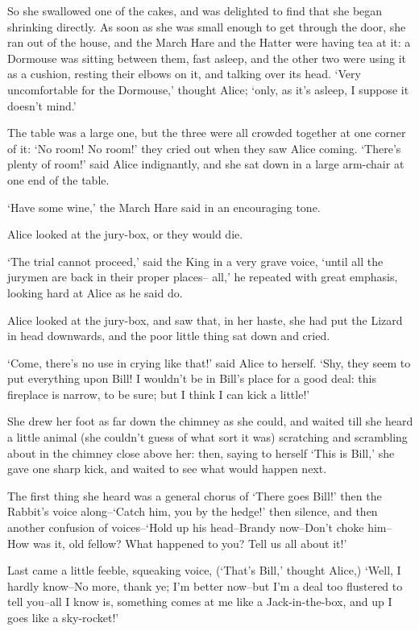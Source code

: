 \documentclass[statementpaper,twoside,openany]{memoir}
\begin{document}
So she swallowed one of the cakes, and was delighted to find that she began shrinking directly. As soon as she was small enough to get through the door, she ran out of the house, and the March Hare and the Hatter were having tea at it: a Dormouse was sitting between them, fast asleep, and the other two were using it as a cushion, resting their elbows on it, and talking over its head. `Very uncomfortable for the Dormouse,' thought Alice; `only, as it's asleep, I suppose it doesn't mind.'

The table was a large one, but the three were all crowded together at one corner of it: `No room! No room!' they cried out when they saw Alice coming. `There's plenty of room!' said Alice indignantly, and she sat down in a large arm-chair at one end of the table.

`Have some wine,' the March Hare said in an encouraging tone.

Alice looked at the jury-box, or they would die.

`The trial cannot proceed,' said the King in a very grave voice, `until all the jurymen are back in their proper places-- all,' he repeated with great emphasis, looking hard at Alice as he said do.

Alice looked at the jury-box, and saw that, in her haste, she had put the Lizard in head downwards, and the poor little thing sat down and cried.

`Come, there's no use in crying like that!' said Alice to herself. `Shy, they seem to put everything upon Bill! I wouldn't be in Bill's place for a good deal: this fireplace is narrow, to be sure; but I think I can kick a little!'

She drew her foot as far down the chimney as she could, and waited till she heard a little animal (she couldn't guess of what sort it was) scratching and scrambling about in the chimney close above her: then, saying to herself `This is Bill,' she gave one sharp kick, and waited to see what would happen next.

The first thing she heard was a general chorus of `There goes Bill!' then the Rabbit's voice along--`Catch him, you by the hedge!' then silence, and then another confusion of voices--`Hold up his head--Brandy now--Don't choke him--How was it, old fellow? What happened to you? Tell us all about it!'

Last came a little feeble, squeaking voice, (`That's Bill,' thought Alice,) `Well, I hardly know--No more, thank ye; I'm better now--but I'm a deal too flustered to tell you--all I know is, something comes at me like a Jack-in-the-box, and up I goes like a sky-rocket!'
\end{document}
